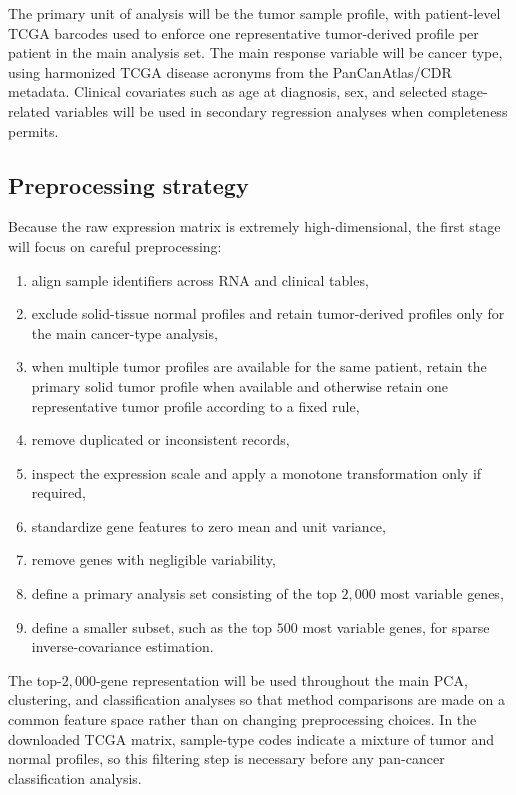 \documentclass[12pt]{article}
\newcommand{\1}{\mathbf{1}}
\begin{document}
The primary unit of analysis will be the tumor sample profile, with patient-level TCGA barcodes used to enforce one representative tumor-derived profile per patient in the main analysis set. The main response variable will be cancer type, using harmonized TCGA disease acronyms from the PanCanAtlas/CDR metadata. Clinical covariates such as age at diagnosis, sex, and selected stage-related variables will be used in secondary regression analyses when completeness permits.

\subsection{Preprocessing strategy}

Because the raw expression matrix is extremely high-dimensional, the first stage will focus on careful preprocessing:
\begin{enumerate}
    \item align sample identifiers across RNA and clinical tables,
    \item exclude solid-tissue normal profiles and retain tumor-derived profiles only for the main cancer-type analysis,
    \item when multiple tumor profiles are available for the same patient, retain the primary solid tumor profile when available and otherwise retain one representative tumor profile according to a fixed rule,
    \item remove duplicated or inconsistent records,
    \item inspect the expression scale and apply a monotone transformation only if required,
    \item standardize gene features to zero mean and unit variance,
    \item remove genes with negligible variability,
    \item define a primary analysis set consisting of the top \(2{,}000\) most variable genes,
    \item define a smaller subset, such as the top \(500\) most variable genes, for sparse inverse-covariance estimation.
\end{enumerate}

The top-\(2{,}000\)-gene representation will be used throughout the main PCA, clustering, and classification analyses so that method comparisons are made on a common feature space rather than on changing preprocessing choices. In the downloaded TCGA matrix, sample-type codes indicate a mixture of tumor and normal profiles, so this filtering step is necessary before any pan-cancer classification analysis.
\end{document}
